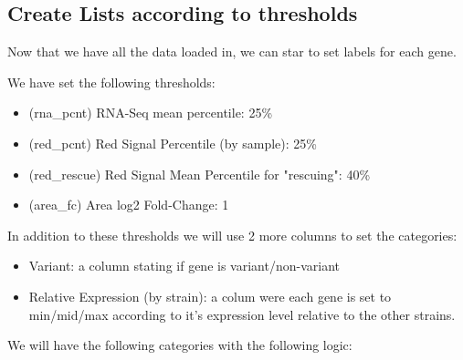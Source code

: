 \documentclass[11pt]{article}
\begin{document}
\subsection{Create Lists according to thresholds}
\label{sec:org5b85d47}

Now that we have all the data loaded in, we can star to set labels for each gene.

We have set the following thresholds:
\begin{itemize}
\item (rna\_pcnt) RNA-Seq mean percentile: 25\%
\item (red\_pcnt) Red Signal Percentile (by sample): 25\%
\item (red\_rescue) Red Signal Mean Percentile for "rescuing": 40\%
\item (area\_fc) Area log2 Fold-Change: 1
\end{itemize}

In addition to these thresholds we will use 2 more columns to set the categories:
\begin{itemize}
\item Variant: a column stating if gene is variant/non-variant
\item Relative Expression (by strain): a colum were each gene is set to min/mid/max according to it's expression level relative to the other strains.
\end{itemize}

We will have the following categories with the following logic:
\end{document}
